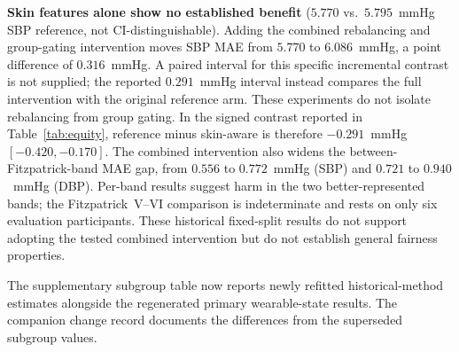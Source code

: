 \documentclass[journal]{IEEEtran}
\begin{document}
\textbf{Skin features alone show no established benefit} ($5.770$ vs.\ $5.795$~mmHg SBP reference, not CI-distinguishable). Adding the combined rebalancing and group-gating intervention moves SBP MAE from $5.770$ to $6.086$~mmHg, a point difference of $0.316$~mmHg. A paired interval for this specific incremental contrast is not supplied; the reported $0.291$~mmHg interval instead compares the full intervention with the original reference arm. These experiments do not isolate rebalancing from group gating. In the signed contrast reported in Table~\ref{tab:equity}, reference minus skin-aware is therefore $-0.291$~mmHg $[-0.420,-0.170]$. The combined intervention also widens the between-Fitzpatrick-band MAE gap, from $0.556$ to $0.772$~mmHg (SBP) and $0.721$ to $0.940$~mmHg (DBP). Per-band results suggest harm in the two better-represented bands; the Fitzpatrick~V--VI comparison is indeterminate and rests on only six evaluation participants. These historical fixed-split results do not support adopting the tested combined intervention but do not establish general fairness properties.

The supplementary subgroup table now reports newly refitted historical-method estimates alongside the regenerated primary wearable-state results. The companion change record documents the differences from the superseded subgroup values.
\end{document}
